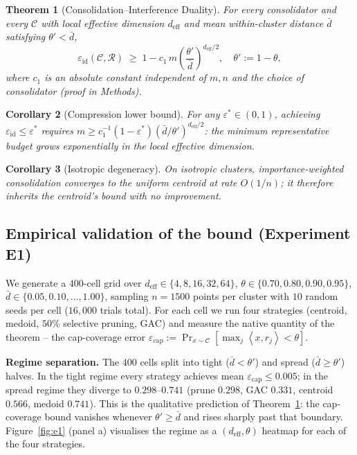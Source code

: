 \documentclass[11pt]{article}
\newtheorem{theorem}{Theorem}
\newtheorem{corollary}[theorem]{Corollary}
\theoremstyle{definition}
\theoremstyle{remark}
\newcommand{\deff}{d_{\mathrm{eff}}}
\newcommand{\dbar}{\bar{d}}
\newcommand{\thetap}{\theta'}
\newcommand{\clusterset}{\mathcal{C}}
\newcommand{\reps}{\mathcal{R}}
\newcommand{\inner}[2]{\left\langle#1,#2\right\rangle}
\newcommand{\eps}{\varepsilon}
\begin{document}
\begin{theorem}[Consolidation--Interference Duality]
\label{thm:duality}
For every consolidator and every $\clusterset$ with local effective dimension
$\deff$ and mean within-cluster distance $\dbar$ satisfying $\thetap<\dbar$,
\[
\eps_{\mathrm{id}}(\clusterset, \reps) \;\geq\; 1 - c_1\, m \left(\frac{\thetap}{\dbar}\right)^{\deff/2},
\quad \thetap := 1 - \theta,
\]
where $c_1$ is an absolute constant independent of $m, n$ and the choice of
consolidator (proof in Methods).
\end{theorem}

\begin{corollary}[Compression lower bound]
\label{cor:compression}
For any $\eps^\ast \in (0,1)$, achieving $\eps_{\mathrm{id}} \leq \eps^\ast$
requires $m \geq c_1^{-1}(1-\eps^\ast)(\dbar/\thetap)^{\deff/2}$: the minimum
representative budget grows exponentially in the local effective dimension.
\end{corollary}

\begin{corollary}[Isotropic degeneracy]
\label{cor:iw}
On isotropic clusters, importance-weighted consolidation converges to the
uniform centroid at rate $O(1/n)$; it therefore inherits the centroid's bound
with no improvement.
\end{corollary}

\subsection*{Empirical validation of the bound (Experiment E1)}
We generate a $400$-cell grid over
$\deff \in \{4,8,16,32,64\}$, $\theta \in \{0.70, 0.80, 0.90, 0.95\}$,
$\dbar \in \{0.05, 0.10, \ldots, 1.00\}$, sampling $n=1500$ points per cluster
with $10$ random seeds per cell ($16{,}000$ trials total).  For each cell we
run four strategies (centroid, medoid, $50\%$ selective pruning, GAC) and
measure the native quantity of the theorem -- the cap-coverage error
$\eps_{\mathrm{cap}} := \Pr_{x \sim \clusterset}[\max_j \inner{x}{r_j} < \theta]$.

\textbf{Regime separation.} The $400$ cells split into
tight ($\dbar < \thetap$) and spread ($\dbar \geq \thetap$) halves.
In the tight regime every strategy achieves mean
$\eps_{\mathrm{cap}} \leq 0.005$; in the spread regime they diverge to
$0.298$--$0.741$ (prune $0.298$, GAC $0.331$, centroid $0.566$,
medoid $0.741$). This is the qualitative prediction of
Theorem~\ref{thm:duality}: the cap-coverage bound vanishes whenever
$\thetap \geq \dbar$ and rises sharply past that boundary.
Figure~\ref{fig:e1} (panel a) visualises the regime as a
$(\deff, \theta)$ heatmap for each of the four strategies.
\end{document}
